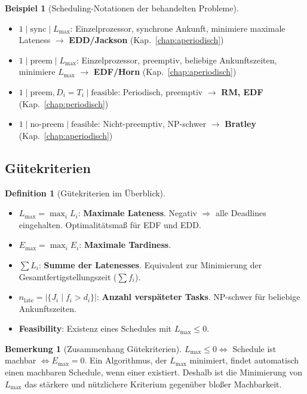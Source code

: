 ﻿\documentclass[a4paper,12pt]{report}
\theoremstyle{definition}
\newtheorem{definition}{Definition}[chapter]
\newtheorem{beispiel}{Beispiel}[chapter]
\newtheorem{bemerkung}{Bemerkung}[chapter]
\begin{document}
\begin{beispiel}[Scheduling-Notationen der behandelten Probleme]
	\begin{itemize}
		\item $1 \mid \text{sync} \mid L_{\max}$: Einzelprozessor, synchrone
		      Ankunft, minimiere maximale Lateness $\to$ \textbf{EDD/Jackson} (Kap.~\ref{chap:aperiodisch})
		\item $1 \mid \text{preem} \mid L_{\max}$: Einzelprozessor, preemptiv,
		      beliebige Ankunftszeiten, minimiere $L_{\max}$ $\to$ \textbf{EDF/Horn} (Kap.~\ref{chap:aperiodisch})
		\item $1 \mid \text{preem}, D_i=T_i \mid \text{feasible}$: Periodisch,
		      preemptiv $\to$ \textbf{RM, EDF} (Kap.~\ref{chap:periodisch})
		\item $1 \mid \text{no-preem} \mid \text{feasible}$: Nicht-preemptiv,
		      NP-schwer $\to$ \textbf{Bratley} (Kap.~\ref{chap:aperiodisch})
	\end{itemize}
\end{beispiel}

\subsection{Gütekriterien}

\begin{definition}[Gütekriterien im Überblick]
	\begin{itemize}
		\item $L_{\max} = \max_i L_i$: \textbf{Maximale Lateness}. Negativ $\Rightarrow$
		      alle Deadlines eingehalten. Optimalitätsmaß für EDF und EDD.
		\item $E_{\max} = \max_i E_i$: \textbf{Maximale Tardiness}.
		\item $\sum L_i$: \textbf{Summe der Latenesses}. Equivalent zur Minimierung
		      der Gesamtfertigstellungszeit ($\sum f_i$).
		\item $n_{\text{late}} = |\{J_i \mid f_i > d_i\}|$: \textbf{Anzahl verspäteter
		      Tasks}. NP-schwer für beliebige Ankunftszeiten.
		\item \textbf{Feasibility}: Existenz eines Schedules mit $L_{\max} \leq 0$.
	\end{itemize}
\end{definition}

\begin{bemerkung}[Zusammenhang Gütekriterien]
	$L_{\max} \leq 0 \iff$ Schedule ist machbar $\iff E_{\max} = 0$.
	Ein Algorithmus, der $L_{\max}$ minimiert, findet automatisch einen
	machbaren Schedule, wenn einer existiert. Deshalb ist die Minimierung
	von $L_{\max}$ das stärkere und nützlichere Kriterium gegenüber
	bloßer Machbarkeit.
\end{bemerkung}
\end{document}
